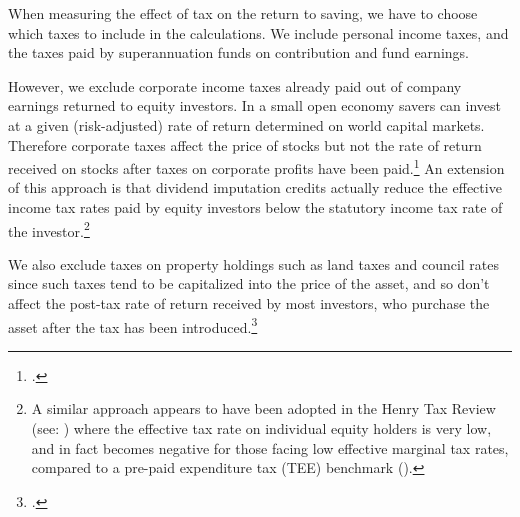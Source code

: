 \documentclass{grattanAlpha}
\begin{document}
When measuring the effect of tax on the return to saving, we have to choose which taxes to include in the calculations. We include personal income taxes, and the taxes paid by superannuation funds on contribution and fund earnings. 

However, we exclude corporate income taxes already paid out of company earnings returned to equity investors. In a small open economy savers can invest at a given (risk-adjusted) rate of return determined on world capital markets. Therefore corporate taxes affect the price of stocks but not the rate of return received on stocks after taxes on corporate profits have been paid.\footcite[][7]{Wakefield2009}  An extension of this approach is that dividend imputation credits actually reduce the effective income tax rates paid by equity investors below the statutory income tax rate of the investor.\footnote{A similar approach appears to have been adopted in the Henry Tax Review (see: \textcite[][Figure~A1-19]{HenryTaxReview2010}) where the effective tax rate on individual equity holders is very low, and in fact becomes negative for those facing low effective marginal tax rates, compared to a pre-paid expenditure tax (TEE) benchmark (\textcite[][67]{HenryTaxReview2010}).}  

We also exclude taxes on property holdings such as land taxes and council rates since such taxes tend to be capitalized into the price of the asset, and so don’t affect the post-tax rate of return received by most investors, who purchase the asset after the tax has been introduced.\footcite{DaleyCoates2015PropertyTaxes}  


\printbibliography[title=References]
\end{document}
